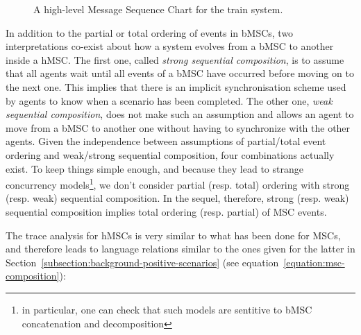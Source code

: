 \begin{figure}\centering
{}
\caption{A high-level Message Sequence Chart for the train system.\label{image:train-hmsc}}
\end{figure}

In addition to the partial or total ordering of events in bMSCs, two interpretations co-exist about how a system evolves from a bMSC to another inside a hMSC. The first one, called \emph{strong sequential composition}, is to assume that all agents wait until all events of a bMSC have occurred before moving on to the next one. This implies that there is an implicit synchronisation scheme used by agents to know when a scenario has been completed. The other one, \emph{weak sequential composition}, does not make such an assumption and allows an agent to move from a bMSC to another one without having to synchronize with the other agents. Given the independence between assumptions of partial/total event ordering and weak/strong sequential composition, four combinations actually exist. To keep things simple enough, and because they lead to strange concurrency models\footnote{in particular, one can check that such models are sentitive to bMSC concatenation and decomposition}, we don't consider partial (resp. total) ordering with strong (resp. weak) sequential composition. In the sequel, therefore, strong (resp. weak) sequential composition implies total ordering (resp. partial) of MSC events.

The trace analysis for hMSCs is very similar to what has been done for MSCs, and therefore leads to language relations similar to the ones given for the latter in Section~\ref{subsection:background-positive-scenarios} (see equation~\ref{equation:msc-composition}):

